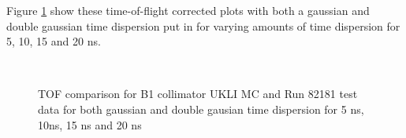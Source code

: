 Figure \ref{fig:TOF_dispersion_plots} show these time-of-flight corrected plots with both a gaussian and double gaussian time dispersion put in for varying amounts of time dispersion for 5, 10, 15 and 20 ns. 

\begin{figure}[!htbp]
    \centering
    
    \caption{TOF comparison for B1 collimator UKLI MC and Run 82181 test data for both gaussian and double gausian time dispersion for 5 ns, 10ns, 15 ns and 20 ns}\label{fig:TOF_dispersion_plots}
    
     \\
\end{figure}

